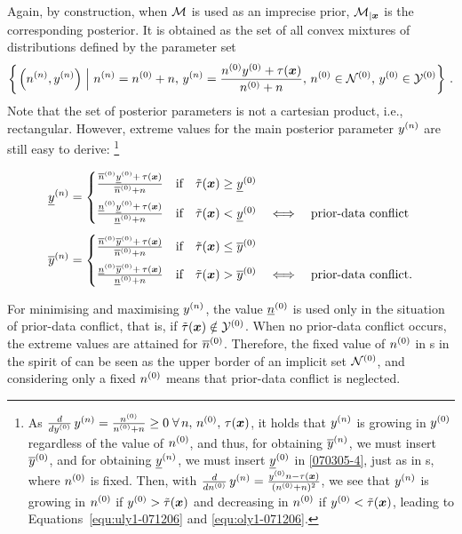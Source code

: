 \begin{remark}
Again, by construction, when ${\cal M}$ is used as an
imprecise prior,  ${\cal M}_{|{\bm x}}$ is the corresponding posterior. It is obtained
as the set of all convex mixtures of
distributions defined by the parameter set
\begin{equation*}
\left\{ \left. \left(n^{(n)},y^{(n)}\right) \; \right| \, n^{(n)} = n^{(0)} + n,\, y^{(n)} = \frac{n^{(0)}y^{(0)} + \tau({\bm x})}{n^{(0)} + n},\,
n^{(0)} \in \mathcal{N}^{(0)},\, y^{(0)} \in \mathcal{Y}^{(0)} \right\}\,.
\end{equation*}
Note that the set of posterior parameters is not a cartesian product, i.e., rectangular. However,
extreme values for the main posterior parameter $y^{(n)}$ are still easy to derive:%
\footnote{As $\frac{d}{d y^{(0)}}\, y^{(n)} = \frac{n^{(0)}}{n^{(0)} + n} \ge 0 \;
\forall\, n,\, n^{(0)},\,\tau({\bm x})$, it holds that $y^{(n)}$ is growing in
$y^{(0)}$ regardless of the value of $n^{(0)}$, and thus, for obtaining
$\overline{y}^{(n)}$, we must insert $\overline{y}^{(0)}$, and for obtaining
$\underline{y}^{(n)}$, we must insert $\underline{y}^{(0)}$ in \eqref{070305-4}, just as
in \ymodel s, where $n^{(0)}$ is fixed. Then, with
$\frac{d}{d n^{(0)}}\, y^{(n)}  = \frac{y^{(0)} n - \tau({\bm x})}{(n^{(0)} + n)^2}$, we see that $y^{(n)}$
is growing in $n^{(0)}$ if $y^{(0)} > \tilde{\tau}({\bm x})$ and decreasing in
$n^{(0)}$ if $y^{(0)} < \tilde{\tau}({\bm x})$, leading to
Equations~\eqref{equ:uly1-071206} and \eqref{equ:oly1-071206}.}

\begin{align}
\underline{y}^{(n)} &= \label{equ:uly1-071206}
\begin{cases}
\frac{\overline{n}^{(0)} \underline{y}^{(0)} + \,\tau({\bm x})}{\overline{n}^{(0)} + n} & \text{if}\quad \tilde{\tau}({\bm x}) \ge \underline{y}^{(0)}\\[1.5ex]
\frac{\underline{n}^{(0)} \underline{y}^{(0)} + \,\tau({\bm x})}{\underline{n}^{(0)} + n} & \text{if}\quad \tilde{\tau}({\bm x}) <   \underline{y}^{(0)}
\quad\Longleftrightarrow\quad \text{prior-data conflict}
\end{cases} \\[1ex]
\overline{y}^{(n)} &= \label{equ:oly1-071206}
\begin{cases}
\frac{\overline{n}^{(0)} \overline{y}^{(0)} + \,\tau({\bm x})}{\overline{n}^{(0)} + n} & \text{if}\quad \tilde{\tau}({\bm x}) \le \overline{y}^{(0)}\\[1.5ex]
\frac{\underline{n}^{(0)} \overline{y}^{(0)} + \,\tau({\bm x})}{\underline{n}^{(0)} + n} & \text{if}\quad \tilde{\tau}({\bm x}) >   \overline{y}^{(0)}
\quad\Longleftrightarrow\quad \text{prior-data conflict}.
\end{cases}
\end{align}
\end{remark}

For minimising and maximising $y^{(n)}$, the value $\underline{n}^{(0)}$ is
used only in the situation of prior-data conflict, that is, if
$\tilde{\tau}({\bm x}) \notin \mathcal{Y}^{(0)}$.
When no prior-data conflict occurs, the extreme values are attained for $\overline{n}^{(0)}$.
%
Therefore, the fixed value of $n^{(0)}$ in \ymodel s in the spirit of \textcite{2005:quaeghebeurcooman} can be
seen as the upper border of an implicit set $\mathcal{N}^{(0)}$, and
considering only a fixed $n^{(0)}$ means that prior-data conflict is neglected.

